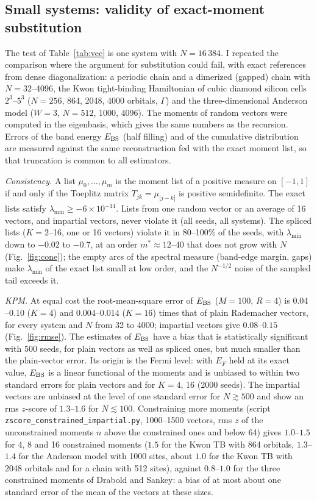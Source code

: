 \documentclass[reprint,nofootinbib,superscriptaddress,amsmath,amssymb,aps,prb,floatfix]{revtex4-2}
\begin{document}
\subsection{Small systems: validity of exact-moment substitution}
\label{sec:small}

The test of Table~\ref{tab:vec} is one system with $N=16\,384$. I repeated the comparison where the argument for substitution could fail, with exact references from dense diagonalization: a periodic chain and a dimerized (gapped) chain with $N=32$--4096, the Kwon tight-binding Hamiltonian of cubic diamond silicon cells $2^3$--$5^3$ ($N=256$, 864, 2048, 4000 orbitals, $\Gamma$) and the three-dimensional Anderson model ($W=3$, $N=512$, 1000, 4096). The moments of random vectors were computed in the eigenbasis, which gives the same numbers as the recursion. Errors of the band energy $E_{\rm BS}$ (half filling) and of the cumulative distribution are measured against the same reconstruction fed with the exact moment list, so that truncation is common to all estimators.

\emph{Consistency.} A list $\mu_0,\dots,\mu_m$ is the moment list of a positive measure on $[-1,1]$ if and only if the Toeplitz matrix $T_{jk}=\mu_{|j-k|}$ is positive semidefinite. The exact lists satisfy $\lambda_{\min}\ge-6\times10^{-14}$. Lists from one random vector or an average of 16 vectors, and impartial vectors, never violate it (all seeds, all systems). The spliced lists ($K=2$--16, one or 16 vectors) violate it in 80--100\% of the seeds, with $\lambda_{\min}$ down to $-0.02$ to $-0.7$, at an order $m^*\approx12$--$40$ that does not grow with $N$ (Fig.~\ref{fig:cone}); the empty arcs of the spectral measure (band-edge margin, gaps) make $\lambda_{\min}$ of the exact list small at low order, and the $N^{-1/2}$ noise of the sampled tail exceeds it.

\emph{KPM.} At equal cost the root-mean-square error of $E_{\rm BS}$ ($M=100$, $R=4$) is $0.04$--$0.10$ ($K=4$) and $0.004$--$0.014$ ($K=16$) times that of plain Rademacher vectors, for every system and $N$ from 32 to 4000; impartial vectors give $0.08$--$0.15$ (Fig.~\ref{fig:rmse}). The estimates of $E_{\rm BS}$ have a bias that is statistically significant with 500 seeds, for plain vectors as well as spliced ones, but much smaller than the plain-vector error. Its origin is the Fermi level: with $E_F$ held at its exact value, $E_{\rm BS}$ is a linear functional of the moments and is unbiased to within two standard errors for plain vectors and for $K=4$, 16 (2000 seeds). The impartial vectors are unbiased at the level of one standard error for $N\gtrsim500$ and show an rms $z$-score of $1.3$--$1.6$ for $N\lesssim100$. Constraining more moments (script \texttt{zscore\_constrained\_impartial.py}, 1000--1500 vectors, rms $z$ of the unconstrained moments $n$ above the constrained ones and below 64) gives $1.0$--$1.5$ for 4, 8 and 16 constrained moments ($1.5$ for the Kwon TB with 864 orbitals, $1.3$--$1.4$ for the Anderson model with 1000 sites, about $1.0$ for the Kwon TB with 2048 orbitals and for a chain with 512 sites), against $0.8$--$1.0$ for the three constrained moments of Drabold and Sankey: a bias of at most about one standard error of the mean of the vectors at these sizes.
\end{document}
